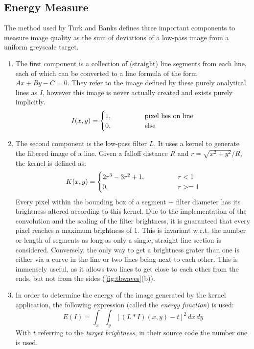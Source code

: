 \subsection{Energy Measure}
The method used by Turk and Banks defines three important components to measure image quality as the sum of deviations of a low-pass image from a uniform greyscale target.
\begin{enumerate}
    \item The first component is a collection of (straight) line segments from each line,
    each of which can be converted to a line formula of the form $Ax + By - C = 0$.
    They refer to the image defined by these purely analytical lines as $I$, however this image is never actually created and exists purely implicitly.
    \begin{equation*}
        I(x,y) = \begin{cases}
            1, \kern4em & \text{pixel lies on line}\\
            0,          & \text{else}
    \end{cases}
    \end{equation*}
    
    \item The second component is the low-pass filter $L$.
    It uses a kernel to generate the filtered image of a line.
    Given a falloff distance $R$ and $r=\sqrt{x^2+y^2} / R$, the kernel is defined as:
    \begin{equation*}
        K(x,y) = \begin{cases}
            2r^3 - 3r^2 + 1, \kern4em & r < 1\\
            0,               & r >= 1
        \end{cases}
    \end{equation*}
    Every pixel within the bounding box of a segment + filter diameter has its brightness altered according to this kernel.
    Due to the implementation of the convolution and the scaling of the filter brightness, it is guaranteed that every pixel reaches a maximum brightness of 1.
    This is invariant w.r.t. the number or length of segments as long as only a single,
    straight line section is considered.
    Conversely, the only way to get a brightness grater than one is either via a curve in the line or two lines being next to each other.
    This is immensely useful, as it allows two lines to get close to each other from the ends, 
    but not from the sides (\cref{fig:tbwaves}(b)).
    
    \item In order to determine the energy of the image generated by the kernel application,
    the following expression (called the \textit{energy function}) is used:
    \begin{equation*}
        E(I) = \int_x\int_y\left[(L\ast I)(x,y)-t\right]^2\,dx\,dy
    \end{equation*}
    With $t$ referring to the \textit{target brightness}, in their source code the number one is used.
\end{enumerate}
